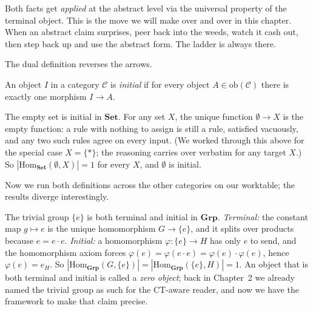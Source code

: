 Both facts get \textit{applied} at the abstract level via the universal
property of the terminal object. This is the move we will make over and over
in this chapter. When an abstract claim surprises, peer back into the weeds,
watch it cash out, then step back up and use the abstract form. The ladder is
always there.

\noindent The dual definition reverses the arrows.

\begin{definition}\label{def:initial}
An object $I$ in a category $\mathcal{C}$ is \textit{initial} if for every object $A \in
\mathrm{ob}(\mathcal{C})$ there is exactly one morphism $I \to A$.
\end{definition}

\begin{example}\label{ex:empty-initial}
The empty set is initial in $\mathbf{Set}$. For any set $X$, the unique
function $\emptyset \to X$ is the empty function: a rule with nothing to
assign is still a rule, satisfied vacuously, and any two such rules agree on
every input. (We worked through this above for the special case
$X = \{*\}$; the reasoning carries over verbatim for any target $X$.) So
$|\mathrm{Hom}_{\mathbf{Set}}(\emptyset, X)| = 1$ for every $X$, and
$\emptyset$ is initial.
\end{example}

\noindent Now we run both definitions across the other categories on our
worktable; the results diverge interestingly.

\begin{example}\label{ex:trivial-grp-zero}
The trivial group $\{e\}$ is both terminal and initial in $\mathbf{Grp}$.
\textit{Terminal:} the constant map $g \mapsto e$ is the unique
homomorphism $G \to \{e\}$, and it splits over products because
$e = e \cdot e$. \textit{Initial:} a homomorphism $\varphi : \{e\} \to H$
has only $e$ to send, and the homomorphism axiom forces
$\varphi(e) = \varphi(e \cdot e) = \varphi(e) \cdot \varphi(e)$, hence
$\varphi(e) = e_H$. So $|\mathrm{Hom}_{\mathbf{Grp}}(G, \{e\})| =
|\mathrm{Hom}_{\mathbf{Grp}}(\{e\}, H)| = 1$. An object that is both
terminal and initial is called a \textit{zero object};
back in Chapter~2 we already named the trivial group as such for the
CT-aware reader, and now we have the framework to make that claim precise.
\end{example}

